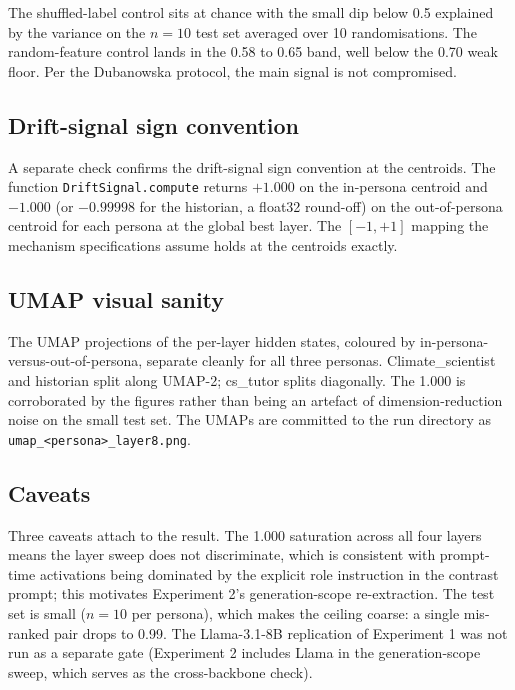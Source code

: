 The shuffled-label control sits at chance with the small dip below 0.5 explained by the variance on the $n = 10$ test set averaged over 10 randomisations. The random-feature control lands in the 0.58 to 0.65 band, well below the 0.70 weak floor. Per the Dubanowska protocol, the main signal is not compromised.

\subsection{Drift-signal sign convention}

A separate check confirms the drift-signal sign convention at the centroids. The function \texttt{DriftSignal.compute} returns $+1.000$ on the in-persona centroid and $-1.000$ (or $-0.99998$ for the historian, a float32 round-off) on the out-of-persona centroid for each persona at the global best layer. The $[-1, +1]$ mapping the mechanism specifications assume holds at the centroids exactly.

\subsection{UMAP visual sanity}

The UMAP projections of the per-layer hidden states, coloured by in-persona-versus-out-of-persona, separate cleanly for all three personas. Climate\_scientist and historian split along UMAP-2; cs\_tutor splits diagonally. The \auroc{} 1.000 is corroborated by the figures rather than being an artefact of dimension-reduction noise on the small test set. The UMAPs are committed to the run directory as \texttt{umap\_<persona>\_layer8.png}.

\subsection{Caveats}

Three caveats attach to the result. The \auroc{} 1.000 saturation across all four layers means the layer sweep does not discriminate, which is consistent with prompt-time activations being dominated by the explicit role instruction in the contrast prompt; this motivates Experiment 2's generation-scope re-extraction. The test set is small ($n = 10$ per persona), which makes the \auroc{} ceiling coarse: a single mis-ranked pair drops to 0.99. The Llama-3.1-8B replication of Experiment 1 was not run as a separate gate (Experiment 2 includes Llama in the generation-scope sweep, which serves as the cross-backbone check).

